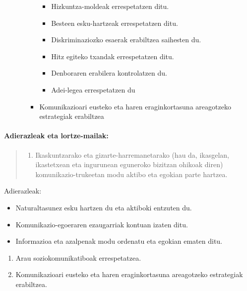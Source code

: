 \documentclass[
]{book}
\providecommand{\tightlist}{%
  \setlength{\itemsep}{0pt}\setlength{\parskip}{0pt}}
\begin{document}
\begin{itemize}
\begin{itemize}
\begin{itemize}
      \begin{itemize}
      \tightlist
      \item
        Hizkuntza-moldeak errespetatzen ditu.
      \item
        Besteen esku-hartzeak errespetatzen ditu.
      \item
        Diskriminaziozko esaerak erabiltzea saihesten du.
      \item
        Hitz egiteko txandak errespetatzen ditu.
      \item
        Denboraren erabilera kontrolatzen du.
      \item
        Adei-legea errespetatzen du
      \end{itemize}
    \item
      Komunikazioari eusteko eta haren eraginkortasuna areagotzeko estrategiak erabiltzea
    \end{itemize}
  \end{itemize}
\end{itemize}

\hypertarget{adierazleak-eta-lortze-mailak}{%
\paragraph{Adierazleak eta lortze-mailak:}\label{adierazleak-eta-lortze-mailak}}

\begin{quote}
\begin{enumerate}
\def\labelenumi{(\arabic{enumi})}
\setcounter{enumi}{18}
\tightlist
\item
  Ikaskuntzarako eta gizarte-harremanetarako (hau da, ikasgelan, ikastetxean eta ingurunean eguneroko bizitzan ohikoak diren) komunikazio-trukeetan modu aktibo eta egokian parte hartzea.
\end{enumerate}
\end{quote}

Adierazleak:

\begin{itemize}
\tightlist
\item
  Naturaltasunez esku hartzen du eta aktiboki entzuten du.
\item
  Komunikazio-egoeraren ezaugarriak kontuan izaten ditu.
\item
  Informazioa eta azalpenak modu ordenatu eta egokian ematen ditu.
\end{itemize}

\begin{enumerate}
\def\labelenumi{\arabic{enumi}.}
\setcounter{enumi}{1}
\tightlist
\item
  Arau soziokomunikatiboak errespetatzea.
\item
  Komunikazioari eusteko eta haren eraginkortasuna areagotzeko estrategiak erabiltzea.
\end{enumerate}
\end{document}
